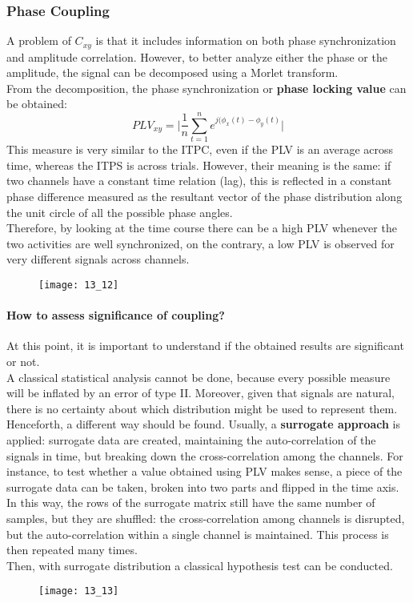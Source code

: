 \subsubsection{Phase Coupling}
A problem of \(C_{xy}\) is that it includes information on both phase synchronization
and amplitude correlation. However, to better analyze either the phase or the
amplitude, the signal can be decomposed using a Morlet transform.\\
From the decomposition, the phase synchronization or \textbf{phase locking value} can
be obtained:
\begin{equation*}
    PLV_{xy}=\biggl|\frac{1}{n}\sum_{t=1}^ne^{j(\phi_x(t)-\phi_y(t)}\biggr|
\end{equation*}
This measure is very similar to the ITPC, even if the PLV is an average across time,
whereas the ITPS is across trials. However, their meaning is the same: if two channels
have a constant time relation (lag), this is reflected in a constant phase difference
measured as the resultant vector of the phase distribution along the unit circle of
all the possible phase angles.\\
Therefore, by looking at the time course there can be a high PLV whenever the two
activities are well synchronized, on the contrary, a low PLV is observed for very
different signals across channels.
\begin{figure}[H]
    \centering
    \texttt{[image: 13\_12]}
\end{figure}
\paragraph{How to assess significance of coupling?}
At this point, it is important to understand if the obtained results are significant
or not.\\
A classical statistical analysis cannot be done, because every possible measure will
be inflated by an error of type II. Moreover, given that signals are natural, there is
no certainty about which distribution might be used to represent them.\\
Henceforth, a different way should be found. Usually, a \textbf{surrogate approach} is
applied: surrogate data are created, maintaining the auto-correlation of the signals in time,
but breaking down the cross-correlation among the channels. For instance, to test
whether a value obtained using PLV makes sense, a piece of the surrogate data can be
taken, broken into two parts and flipped in the time axis. In this way, the rows of
the surrogate matrix still have the same number of samples, but they are shuffled:
the cross-correlation among channels is disrupted, but the auto-correlation within a
single channel is maintained. This process is then repeated many times.\\
Then, with surrogate distribution a classical hypothesis test can be conducted.
\begin{figure}[H]
    \centering
    \texttt{[image: 13\_13]}
\end{figure}
